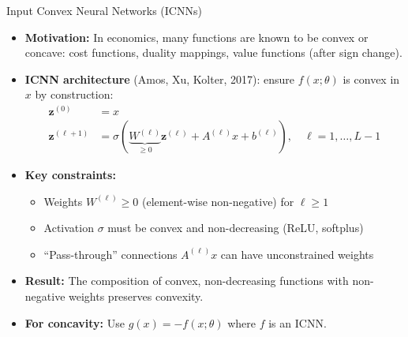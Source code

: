 \documentclass[10pt,english,aspectratio=169]{beamer}
\begin{document}
\begin{frame}{Input Convex Neural Networks (ICNNs)}
\begin{itemize}
\item \textbf{Motivation:} In economics, many functions are known to be convex or concave: cost functions, duality mappings, value functions (after sign change).

\medskip
\item \textbf{ICNN architecture} (Amos, Xu, Kolter, 2017): ensure $f(x;\theta)$ is convex in $x$ by construction:
\begin{align*}
\mathbf{z}^{(0)} &= x \\
\mathbf{z}^{(\ell+1)} &= \sigma\!\left(\underbrace{W^{(\ell)}}_{\geq 0} \mathbf{z}^{(\ell)} + A^{(\ell)} x + b^{(\ell)}\right), \quad \ell = 1,\ldots,L-1
\end{align*}

\item \textbf{Key constraints:}
\begin{itemize}
\item Weights $W^{(\ell)} \geq 0$ (element-wise non-negative) for $\ell \geq 1$
\item Activation $\sigma$ must be convex and non-decreasing (ReLU, softplus)
\item ``Pass-through'' connections $A^{(\ell)} x$ can have unconstrained weights
\end{itemize}

\medskip
\item \textbf{Result:} The composition of convex, non-decreasing functions with non-negative weights preserves convexity.

\medskip
\item \textbf{For concavity:} Use $g(x) = -f(x;\theta)$ where $f$ is an ICNN.
\end{itemize}
\end{frame}
\end{document}
